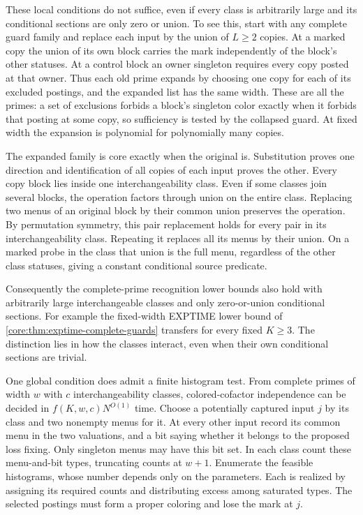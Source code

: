 These local conditions do not suffice, even if every class
is arbitrarily large and its conditional sections are only
zero or union. To see this, start with any complete guard
family and replace each input by the union of $L\ge2$ copies.
At a marked copy the union of its own block carries the mark
independently of the block's other statuses. At a control
block an owner singleton requires every copy posted at that
owner. Thus each old prime expands by choosing one copy for
each of its excluded postings, and the expanded list has
the same width. These are all the primes: a set of exclusions
forbids a block's singleton color exactly when it forbids
that posting at some copy, so sufficiency is tested by the
collapsed guard. At fixed width the expansion is polynomial
for polynomially many copies.

The expanded family is core exactly when the original is.
Substitution proves one direction and identification of all
copies of each input proves the other. Every copy block lies
inside one interchangeability class. Even if some classes
join several blocks, the operation factors through union
on the entire class. Replacing two menus of an original
block by their common union preserves the operation. By
permutation symmetry, this pair replacement holds for every
pair in its interchangeability class. Repeating it replaces
all its menus by their union. On a marked probe in the class
that union is the full menu, regardless of the other class
statuses, giving a constant conditional source predicate.

Consequently the complete-prime recognition lower bounds
also hold with arbitrarily large interchangeable classes
and only zero-or-union conditional sections. For example
the fixed-width EXPTIME lower bound of
\cref{core:thm:exptime-complete-guards} transfers for every
fixed $K\ge3$. The distinction lies in how the classes
interact, even when their own conditional sections are trivial.

One global condition does admit a finite histogram test.
From complete primes of width $w$ with $c$ interchangeability
classes, colored-cofactor independence can be decided in
$f(K,w,c)N^{O(1)}$ time. Choose a potentially captured input
$j$ by its class and two nonempty menus for it. At every
other input record its common menu in the two valuations,
and a bit saying whether it belongs to the proposed loss
fixing. Only singleton menus may have this bit set. In
each class count these menu-and-bit types, truncating
counts at $w+1$. Enumerate the feasible histograms, whose
number depends only on the parameters. Each is realized
by assigning its required counts and distributing excess
among saturated types. The selected postings must form a
proper coloring and lose the mark at $j$.

